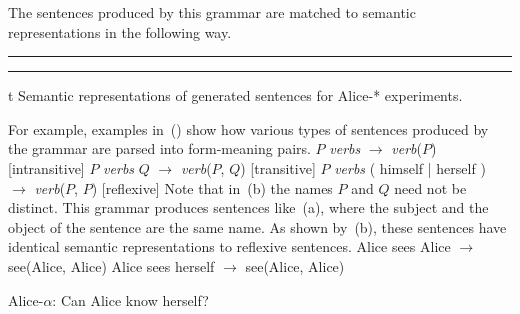 The sentences produced by this grammar are matched to semantic representations
in the following way.

\par\nobreak\medskip
\hrule width 5.5in
\smallskip
{}
\smallskip
\hrule width 5.5in
\par\nobreak\medskip
\caption/t Semantic representations of generated sentences for Alice-* experiments.

For example, examples in~(\nextx) show how various types of sentences produced 
by the grammar are parsed into form-meaning pairs.
\pex
	\a $P$ {\em verbs} $\to$ {\em verb}($P$) \hfill [intransitive]
	\a $P$ {\em verbs} $Q$ $\to$ {\em verb}($P$, $Q$) \hfill [transitive]
	\a $P$ {\em verbs} ( himself | herself ) $\to$ {\em verb}($P$, $P$) \hfill [reflexive]
\xe
Note that in~(\lastx b) the names $P$ and $Q$ need not be distinct. This 
grammar produces sentences like~(\nextx a), where the subject and the object
of the sentence are the same name. As shown by~(\nextx b), these sentences have
identical semantic representations to reflexive sentences.
\pex
	\a Alice sees Alice $\to$ see(Alice, Alice)
	\a Alice sees herself $\to$ see(Alice, Alice)
\xe

\ssec Alice-$\alpha$: Can Alice know herself?

